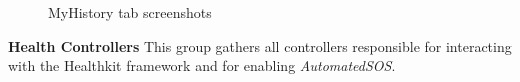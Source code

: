 \documentclass[titlepage]{article}
\begin{document}
{\begin{itemize}
		\end{itemize}
		
		\begin{figure}[H]%
			\centering
			\qquad
			\caption{MyHistory tab screenshots}%
			\label{fig:RequestTab}%
		\end{figure}
		
	}
	\noindent
	{\bf Health Controllers} \newline
	This group gathers all controllers responsible for interacting with the Healthkit framework and for enabling {\it AutomatedSOS}.
\end{document}
